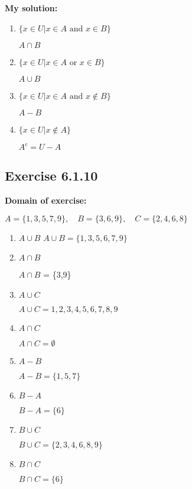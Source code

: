 \documentclass{report}
\newcommand{\cent}[1]{\begin{center}#1\end{center}}
\newcommand{\In}{\! \in \!}
\newcommand{\Domain}{\textbf{Domain of exercise: }}
\newcommand{\solution}{\textbf{My solution: }}
\newcommand{\Exercise}[1]{\subsection{Exercise #1}}
\newcommand{\defaultEnumerateLabel}{\textbf{\alph*.}}
\begin{document}
	\solution
	\begin{enumerate}[label=\defaultEnumerateLabel]
		\item $\{x \in U | x \In A \text{ and } x \In B\}$
		
		\cent{$A \cap B$}
		
		\item $\{x \In U | x \In A \text{ or } x \In B\}$
		
		\cent{$A \cup B$}
		
		\item $\{x \In U | x \In A \text{ and } x \notin B \}$
		
		\cent{$A - B$}
		
		\item $\{x \In U | x \notin A \}$
		
		\cent{$A^c = U - A$}
		
		\end{enumerate}
		
		\Exercise{6.1.10}
		
		\Domain
		\cent{$A = \{1,3,5,7,9\}, \quad B = \{3,6,9\}, \quad C = \{2,4,6,8\}$}
				
		
		\begin{enumerate}[label = \defaultEnumerateLabel]
			\item $A \cup B$
			$A \cup B = \{1,3,5,6,7,9\}$
			
			\item $A \cap B$
			
			$A \cap B$ = \{3,9\}
			
			\item $A \cup C$
			
			\cent{$A \cup C = 1,2,3,4,5,6,7,8,9$}
			
			\item $A \cap C$
			
			\cent{$A \cap C = \emptyset$}
			
			\item $A-B$
			
			\cent{$A-B = \{1,5,7\}$}
			
			\item $B-A$
			
			\cent{$B - A = \{6\}$}
			
			\item $B \cup C$
			
			\cent{$B \cup C = \{2,3,4,6,8,9\}$}
			
			\item $B \cap C$
			
			\cent{$B \cap C = \{6\}$}
		\end{enumerate}
		
\end{document}
